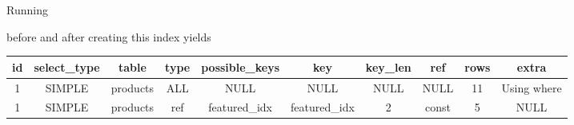\documentclass{article}
\newcommand{\sql}[1]{}
\begin{document}
Running
\sql{explain}
before and after creating this index yields\\
\begin{tabular}{ | c c c c c c c c c c | }
  \hline
  id & select\_type & table & type & possible\_keys & key & key\_len & ref & rows & extra\\
  \hline
  1 & SIMPLE & products & ALL & NULL & NULL & NULL & NULL & 11 & Using where\\
  1 & SIMPLE & products & ref & featured\_idx & featured\_idx & 2 & const & 5 & NULL\\
  \hline
\end{tabular}
\end{document}
